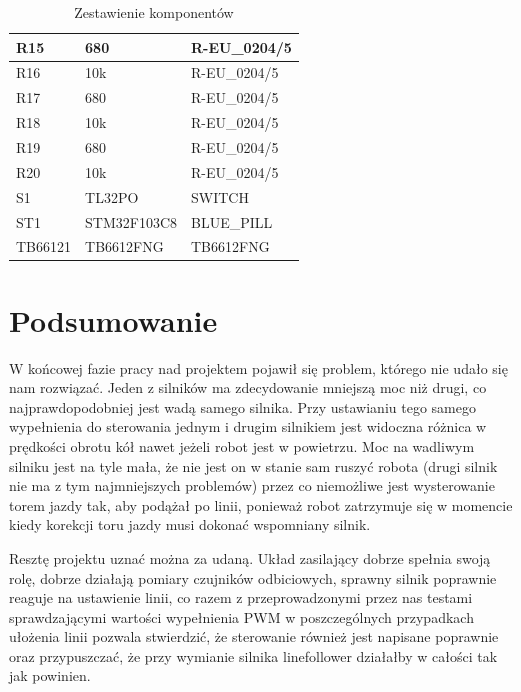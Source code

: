 \documentclass[10pt, a4paper]{article}
\begin{document}
\begin{table}[H]
\begin{tabular}{l|ll}
		R15     & 680         & R-EU\_0204/5    \\ \hline
		R16     & 10k         & R-EU\_0204/5    \\ \hline
		R17     & 680         & R-EU\_0204/5    \\ \hline
		R18     & 10k         & R-EU\_0204/5    \\ \hline
		R19     & 680         & R-EU\_0204/5    \\ \hline
		R20     & 10k         & R-EU\_0204/5    \\ \hline
		S1      & TL32PO      & SWITCH          \\ \hline
		ST1     & STM32F103C8 & BLUE\_PILL      \\ \hline
		TB66121 & TB6612FNG   & TB6612FNG       \\ \hline
	\end{tabular}
	\caption{Zestawienie komponentów}
\end{table}
\section{Podsumowanie}

W końcowej fazie pracy nad projektem pojawił się problem, którego nie udało się nam rozwiązać. Jeden z silników ma zdecydowanie mniejszą moc niż drugi, co najprawdopodobniej jest wadą samego silnika. Przy ustawianiu tego samego wypełnienia do sterowania jednym i drugim silnikiem jest widoczna różnica w prędkości obrotu kół nawet jeżeli robot jest w powietrzu. Moc na wadliwym silniku jest na tyle mała, że nie jest on w stanie sam ruszyć robota (drugi silnik nie ma z tym najmniejszych problemów) przez co niemożliwe jest wysterowanie torem jazdy tak, aby podążał po linii, ponieważ robot zatrzymuje się w momencie kiedy korekcji toru jazdy musi dokonać wspomniany silnik.

Resztę projektu uznać można za udaną. Układ zasilający dobrze spełnia swoją rolę, dobrze działają pomiary czujników odbiciowych, sprawny silnik poprawnie reaguje na ustawienie linii, co razem z przeprowadzonymi przez nas testami sprawdzającymi wartości wypełnienia PWM w poszczególnych przypadkach ułożenia linii pozwala stwierdzić, że sterowanie również jest napisane poprawnie oraz przypuszczać, że przy wymianie silnika linefollower działałby w całości tak jak powinien.


\newpage
{}


\end{document}
